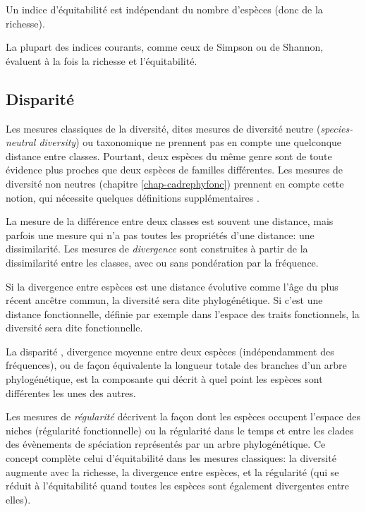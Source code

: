 \documentclass[
  11pt,
  french,
  a4paper,
  extrafontsizes,onecolumn,openright
  ]{memoir}
\newlength{\rf}
\begin{document}
Un indice d'équitabilité est indépendant du nombre d'espèces (donc de la richesse).

La plupart des indices courants, comme ceux de Simpson ou de Shannon, évaluent à la fois la richesse et l'équitabilité.

\subsection{Disparité}\label{disparituxe9}

Les mesures classiques de la diversité, dites mesures de diversité neutre (\emph{species-neutral diversity}) ou taxonomique ne prennent pas en compte une quelconque distance entre classes.
Pourtant, deux espèces du même genre sont de toute évidence plus proches que deux espèces de familles différentes.
Les mesures de diversité non neutres (chapitre \ref{chap-cadrephyfonc}) prennent en compte cette notion, qui nécessite quelques définitions supplémentaires \autocite{Mouillot2005,Ricotta2007}.

La mesure de la différence entre deux classes est souvent une distance, mais parfois une mesure qui n'a pas toutes les propriétés d'une distance: une dissimilarité.
Les mesures de \emph{divergence} \autocite{Pavoine2011} sont construites à partir de la dissimilarité entre les classes, avec ou sans pondération par la fréquence.

Si la divergence entre espèces est une distance évolutive comme l'âge du plus récent ancêtre commun, la diversité sera dite phylogénétique.
Si c'est une distance fonctionnelle, définie par exemple dans l'espace des traits fonctionnels, la diversité sera dite fonctionnelle.

La disparité \autocite{Runnegar1987}, divergence moyenne entre deux espèces (indépendamment des fréquences), ou de façon équivalente la longueur totale des branches d'un arbre phylogénétique, est la composante qui décrit à quel point les espèces sont différentes les unes des autres.

Les mesures de \emph{régularité} décrivent la façon dont les espèces occupent l'espace des niches (régularité fonctionnelle) ou la régularité dans le temps et entre les clades des évènements de spéciation représentés par un arbre phylogénétique.
Ce concept complète celui d'équitabilité dans les mesures classiques: la diversité augmente avec la richesse, la divergence entre espèces, et la régularité (qui se réduit à l'équitabilité quand toutes les espèces sont également divergentes entre elles).
\end{document}
